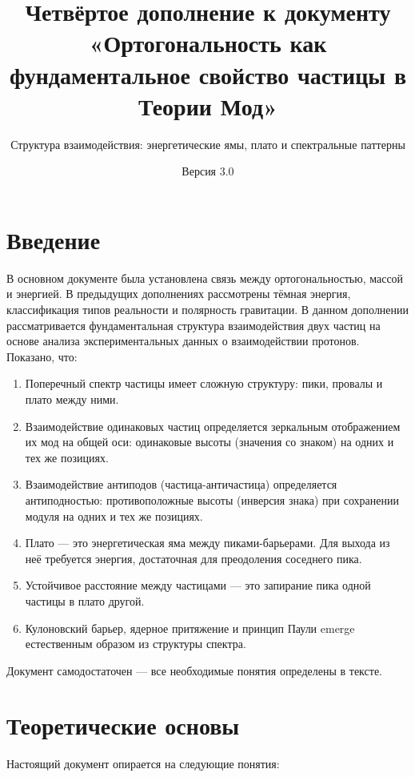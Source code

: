 \documentclass[12pt,a4paper]{article}
\title{\textbf{Четвёртое дополнение к документу}\\
\large «Ортогональность как фундаментальное свойство частицы в Теории Мод»}
\subtitle{Структура взаимодействия: энергетические ямы, плато и спектральные паттерны}
\author{}
\date{Версия 3.0}
\begin{document}
\maketitle

\section{Введение}
В основном документе была установлена связь между ортогональностью, массой и энергией. В предыдущих дополнениях рассмотрены тёмная энергия, классификация типов реальности и полярность гравитации. В данном дополнении рассматривается фундаментальная структура взаимодействия двух частиц на основе анализа экспериментальных данных о взаимодействии протонов. Показано, что:

\begin{enumerate}[label=\arabic*.]
    \item Поперечный спектр частицы имеет сложную структуру: пики, провалы и плато между ними.
    \item Взаимодействие одинаковых частиц определяется зеркальным отображением их мод на общей оси: одинаковые высоты (значения со знаком) на одних и тех же позициях.
    \item Взаимодействие антиподов (частица-античастица) определяется антиподностью: противоположные высоты (инверсия знака) при сохранении модуля на одних и тех же позициях.
    \item Плато --- это энергетическая яма между пиками-барьерами. Для выхода из неё требуется энергия, достаточная для преодоления соседнего пика.
    \item Устойчивое расстояние между частицами --- это запирание пика одной частицы в плато другой.
    \item Кулоновский барьер, ядерное притяжение и принцип Паули emerge естественным образом из структуры спектра.
\end{enumerate}

Документ самодостаточен --- все необходимые понятия определены в тексте.

\section{Теоретические основы}
Настоящий документ опирается на следующие понятия:
\end{document}
